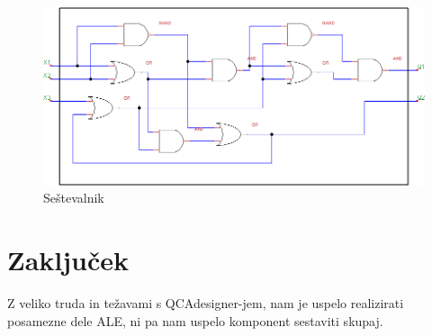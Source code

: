 \documentclass[seminar, slovene]{FRIreport}
\begin{document}
\begin{figure}[H]
\includegraphics[width=14cm]{vezja/img/adder}
\caption{Seštevalnik}
\label{sestevalnik}
\end{figure}

%
\section{Zaključek}
Z veliko truda in težavami s QCAdesigner-jem, nam je uspelo realizirati posamezne dele ALE, ni pa nam uspelo komponent sestaviti skupaj.

%
\References


\end{document}
